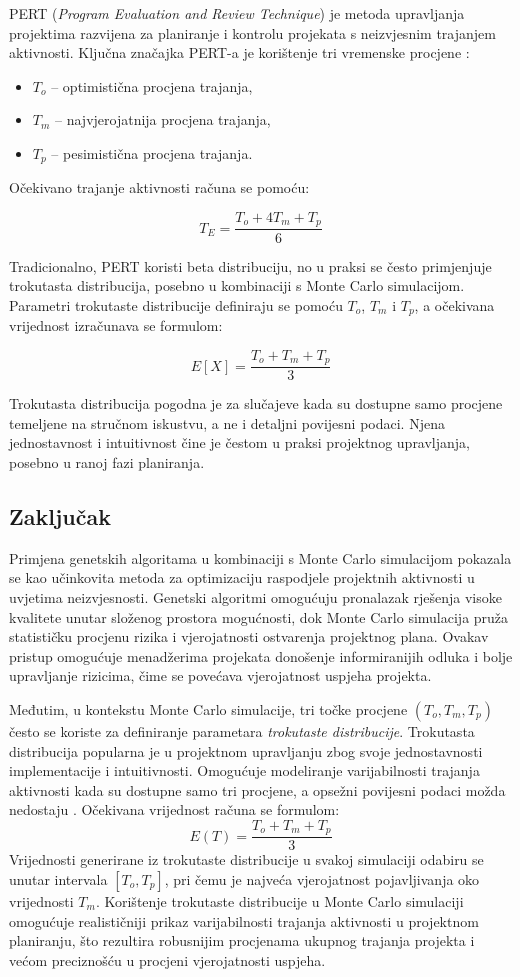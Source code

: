 PERT (\textit{Program Evaluation and Review Technique}) je metoda upravljanja projektima razvijena za planiranje i kontrolu projekata s neizvjesnim trajanjem aktivnosti. Ključna značajka PERT-a je korištenje tri vremenske procjene \cite{Kerzner2017}:

\begin{itemize}
    \item $T_o$ – optimistična procjena trajanja,
    \item $T_m$ – najvjerojatnija procjena trajanja,
    \item $T_p$ – pesimistična procjena trajanja.
\end{itemize}

Očekivano trajanje aktivnosti računa se pomoću:

\[
T_E = \frac{T_o + 4T_m + T_p}{6}
\]

Tradicionalno, PERT koristi beta distribuciju, no u praksi se često primjenjuje trokutasta distribucija, posebno u kombinaciji s Monte Carlo simulacijom. Parametri trokutaste distribucije definiraju se pomoću $T_o$, $T_m$ i $T_p$, a očekivana vrijednost izračunava se formulom:

\[
E[X] = \frac{T_o + T_m + T_p}{3}
\]

Trokutasta distribucija pogodna je za slučajeve kada su dostupne samo procjene temeljene na stručnom iskustvu, a ne i detaljni povijesni podaci. Njena jednostavnost i intuitivnost čine je čestom u praksi projektnog upravljanja, posebno u ranoj fazi planiranja.


\subsection{Zaključak}
Primjena genetskih algoritama u kombinaciji s Monte Carlo simulacijom pokazala se kao učinkovita metoda za optimizaciju raspodjele projektnih aktivnosti u uvjetima neizvjesnosti. Genetski algoritmi omogućuju pronalazak rješenja visoke kvalitete unutar složenog prostora mogućnosti, dok Monte Carlo simulacija pruža statističku procjenu rizika i vjerojatnosti ostvarenja projektnog plana. Ovakav pristup omogućuje menadžerima projekata donošenje informiranijih odluka i bolje upravljanje rizicima, čime se povećava vjerojatnost uspjeha projekta.

Međutim, u kontekstu Monte Carlo simulacije, tri točke procjene \((T_o, T_m, T_p)\) često se koriste za definiranje parametara \textit{trokutaste distribucije}. Trokutasta distribucija popularna je u projektnom upravljanju zbog svoje jednostavnosti implementacije i intuitivnosti. Omogućuje modeliranje varijabilnosti trajanja aktivnosti kada su dostupne samo tri procjene, a opsežni povijesni podaci možda nedostaju \cite{Law2015}. Očekivana vrijednost računa se formulom:
\[
E(T) = \frac{T_o + T_m + T_p}{3}
\]
Vrijednosti generirane iz trokutaste distribucije u svakoj simulaciji odabiru se unutar intervala \([T_o, T_p]\), pri čemu je najveća vjerojatnost pojavljivanja oko vrijednosti \(T_m\). Korištenje trokutaste distribucije u Monte Carlo simulaciji omogućuje realističniji prikaz varijabilnosti trajanja aktivnosti u projektnom planiranju, što rezultira robusnijim procjenama ukupnog trajanja projekta i većom preciznošću u procjeni vjerojatnosti uspjeha.
